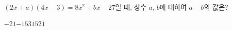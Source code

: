 $(2x+a)(4x-3)=8x^2+bx-27$일 때, 상수 $a$, $b$에 대하여 $a-b$의 값은?
\begin{choices32}{$-21$}{$-15$}{$3$}{$15$}{$21$}\end{choices32}
